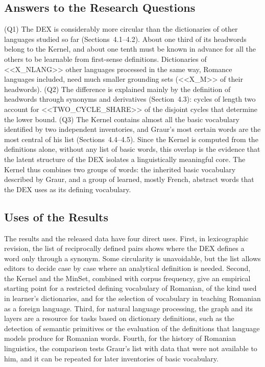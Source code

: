 \documentclass[11pt]{article}
\begin{document}
\subsection{Answers to the Research Questions}
(Q1) The DEX is considerably more circular than the dictionaries of other languages studied so far (Sections~4.1--4.2). About one third of its headwords belong to the Kernel, and about one tenth must be known in advance for all the others to be learnable from first-sense definitions. Dictionaries of <<X_NLANG>> other languages processed in the same way, Romance languages included, need much smaller grounding sets (<<X_M>> of their headwords). (Q2) The difference is explained mainly by the definition of headwords through synonyms and derivatives (Section~4.3): cycles of length two account for <<TWO_CYCLE_SHARE>> of the disjoint cycles that determine the lower bound. (Q3) The Kernel contains almost all the basic vocabulary identified by two independent inventories, and Graur's most certain words are the most central of his list (Sections~4.4--4.5). Since the Kernel is computed from the definitions alone, without any list of basic words, this overlap is the evidence that the latent structure of the DEX isolates a linguistically meaningful core. The Kernel thus combines two groups of words: the inherited basic vocabulary described by Graur, and a group of learned, mostly French, abstract words that the DEX uses as its defining vocabulary.

\subsection{Uses of the Results}
The results and the released data have four direct uses. First, in lexicographic revision, the list of reciprocally defined pairs shows where the DEX defines a word only through a synonym. Some circularity is unavoidable, but the list allows editors to decide case by case where an analytical definition is needed. Second, the Kernel and the MinSet, combined with corpus frequency, give an empirical starting point for a restricted defining vocabulary of Romanian, of the kind used in learner's dictionaries, and for the selection of vocabulary in teaching Romanian as a foreign language. Third, for natural language processing, the graph and its layers are a resource for tasks based on dictionary definitions, such as the detection of semantic primitives \cite{pichardo2017,kostiuk2023} or the evaluation of the definitions that language models produce for Romanian words. Fourth, for the history of Romanian linguistics, the comparison tests Graur's list with data that were not available to him, and it can be repeated for later inventories of basic vocabulary.
\end{document}
